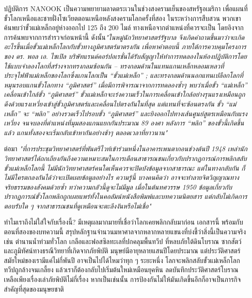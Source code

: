 \documentclass[10pt,twocolumn,letterpaper]{article}
\begin{document}
ปฏิบัติการ NANOOK เป็นความพยายามลาดตระเวนในช่วงสงครามเย็นของสหรัฐอเมริกา เพื่อแผนที่ขั้วโลกเหนือและชายฝั่งโซเวียตตอนเหนือหลังสงครามโลกครั้งที่สอง \cite{137} ในระหว่างการสืบสวน พวกเขาค้นพบว่าขั้วแม่เหล็กอยู่ห่างออกไป 125 ถึง 200 ไมล์ ทางเหนือจากตำแหน่งที่ควรจะเป็น โดยอิงจากการค้นพบจากการสำรวจก่อนหน้านี้ ดังนั้น\textit{"ในหมู่นักวิทยาศาสตร์รัฐบาล จึงเกิดคำถามขึ้นมาว่าจะเกิดอะไรขึ้นเมื่อขั้วแม่เหล็กโลกกับขั้วทางภูมิศาสตร์มาตรงกัน เพื่อหาคำตอบนี้ ภายใต้การควบคุมโครงการของ ดร. พอล เอ. ไซเปิล บริษัทแรนด์คอร์ปอเรชั่นได้รับสัญญาให้ทำการทดลองในห้องปฏิบัติการโดยใช้แบบจำลองโลกที่สร้างจากทรงกลมซ้อนกัน – ทรงกลมด้านในแทนแกนเหล็กหลอมเหลวที่ประจุไฟฟ้าแม่เหล็กของโลกซึ่งแกนโลกเป็น “ขั้วแม่เหล็ก” ; และทรงกลมด้านนอกแทนเปลือกโลกที่หมุนรอบแกนขั้วโลกทาง “ภูมิศาสตร์” เมื่อมีการพิจารณาจากการทดลองซ้ำๆ พบว่าเมื่อขั้ว  “แม่เหล็ก” เคลื่อนเข้าใกล้ขั้ว “ภูมิศาสตร์” ขั้วแม่เหล็กจะเร่งความเร็วในการเคลื่อนเข้าใกล้อย่างรุนแรงเหมือนถูกดึงด้วยแรงเหวี่ยงเข้าสู่ขั้วภูมิศาสตร์และเคลื่อนไปตรงกันในที่สุด แต่แทนที่จะซ้อนตรงกัน ขั้ว “แม่เหล็ก” จะ “พลิก” อย่างรวดเร็วไปรอบขั้ว “ภูมิศาสตร์” และยิงออกไปทางเส้นศูนย์สูตรเหมือนกับแรงเหวี่ยง จนจบลงที่ตำแหน่งที่มุมสองแกนแยกกันประมาณ 89 องศา หลังการ “พลิก” ของขั้วนี้เกิดขึ้นแล้ว แกนทั้งสองจะเริ่มกลับเข้าหากันอย่างช้าๆ ตลอดเวลาที่ยาวนาน"} \cite{138,139}

ต่อมา \textit{"ที่การประชุมวิทยาศาสตร์ที่พันตรีไวท์เข้าร่วมหนึ่งในอาคารเพนตากอนช่วงต้นปี 1948 เหล่านักวิทยาศาสตร์ได้ถกเถียงกันถึงความเหมาะสมในการเตือนสาธารณชนเกี่ยวกับปรากฏการณ์การพลิกสลับขั้วแม่เหล็กโลกนี้ ไม่มีนักวิทยาศาสตร์คนใดเห็นควรจะปิดบังข้อมูลจากสาธารณะ แต่ในทางกลับกัน ก็ไม่มีใครตกลงกันได้ว่าจะเปิดเผยข้อมูลอย่างไร ความรู้นี้ บางคนคิดว่า อาจจะทำลายจิตวิญญาณทางจริยธรรมของสังคมด้วยซ้ำ ทว่าความกลัวนี้ดูจะไม่มีมูล เมื่อในต้นทศวรรษ 1950 ข้อมูลเกี่ยวกับปรากฏการณ์ขั้วโลกพลิกถูกเผยแพร่ทั้งในคอลัมน์หนังสือพิมพ์และบทความนิตยสาร แต่กลับไม่เกิดการตอบรับใด ๆ จากสาธารณชนที่ดูเหมือนจะตะลึงงันหรือไม่เชื่อ"} \cite{138,139}

ทำไมเราถึงไม่ใส่ใจกับเรื่องนี้? มีเหตุผลมากมายที่เชื่อว่าโลกเคยพลิกกลับมาก่อน เอกสารนี้ พร้อมกับตอนที่สองของบทความนี้ สรุปหลักฐานจำนวนมหาศาลจากหลากหลายแขนงที่บ่งชี้ว่าสิ่งนี้เป็นความจริง เช่น ตำนานน้ำท่วมทั่วโลก เกลือและฟอสซิลทะเลที่ปกคลุมพื้นทวีป ที่หลบภัยใต้ดินโบราณ ซากสัตว์ และภูมิทัศน์ทางธรณีวิทยาที่เกิดจากภัยพิบัติ มนุษย์มีอายุหลายแสนปีโดยประมาณ แต่ประวัติศาสตร์สมัยใหม่ของเรามีแค่ไม่กี่พันปี อาจเป็นไปได้ไหมว่าทุก ๆ ระยะหนึ่ง โลกจะพลิกสลับขั้วแม่เหล็กโลก ทวีปถูกล้างจนเกลี้ยง แล้วเราก็ต้องกลับไปเริ่มต้นใหม่เหมือนยุคหิน ลดบันทึกประวัติศาสตร์โบราณเหลือเพียงเรื่องเล่าภัยพิบัติไม่กี่เรื่อง หากเป็นเช่นนั้น การป้องกันไม่ให้มันเกิดขึ้นอีกก็อาจเป็นภารกิจสำคัญที่สุดของมนุษยชาติ
\end{document}
